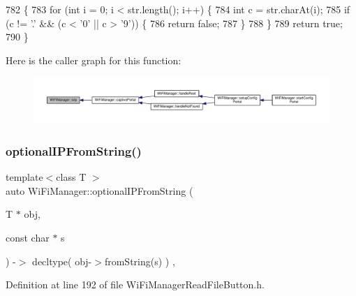 \begin{DoxyCode}
782                                     \{
783   \textcolor{keywordflow}{for} (\textcolor{keywordtype}{int} i = 0; i < str.length(); i++) \{
784     \textcolor{keywordtype}{int} c = str.charAt(i);
785     \textcolor{keywordflow}{if} (c != \textcolor{charliteral}{'.'} && (c < '0' || c > \textcolor{charliteral}{'9'})) \{
786       \textcolor{keywordflow}{return} \textcolor{keyword}{false};
787     \}
788   \}
789   \textcolor{keywordflow}{return} \textcolor{keyword}{true};
790 \}
\end{DoxyCode}
Here is the caller graph for this function\+:
\nopagebreak
\begin{figure}[H]
\begin{center}
\leavevmode
\includegraphics[width=350pt]{d4/dc8/class_wi_fi_manager_a9c78a8774f746ec22a99d03a53baa607_icgraph}
\end{center}
\end{figure}
\mbox{\label{class_wi_fi_manager_a6a94f08eb43e0871932556a4ccfa11b7}} 
\subsubsection{\texorpdfstring{optional\+I\+P\+From\+String()}{optionalIPFromString()}\hspace{0.1cm}{\footnotesize\ttfamily [1/2]}}
{\footnotesize\ttfamily template$<$class T $>$ \\
auto Wi\+Fi\+Manager\+::optional\+I\+P\+From\+String (\begin{DoxyParamCaption}\item[{T $\ast$}]{obj,  }\item[{const char $\ast$}]{s }\end{DoxyParamCaption}) -\/$>$ decltype(  obj-\/$>$from\+String(s)  ) \hspace{0.3cm}{\ttfamily [inline]}, {\ttfamily [private]}}



Definition at line 192 of file Wi\+Fi\+Manager\+Read\+File\+Button.\+h.


